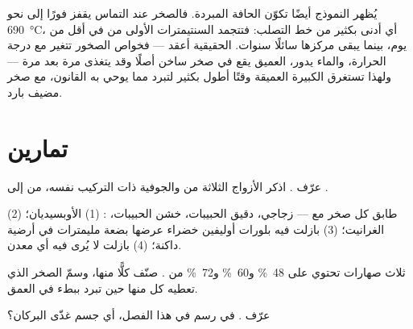 يُظهر النموذج أيضًا تكوّن الحافة المبردة. فالصخر عند التماس
يقفز فورًا إلى نحو \qty{690}{\degreeCelsius}، أي أدنى بكثير من خط التصلب:
فتتجمد السنتيمترات الأولى من  في أقل من يوم، بينما يبقى مركزها
سائلًا سنوات.  الحقيقية أعقد --- فخواص
الصخور تتغير مع درجة الحرارة، والماء يدور،  العميق يقع في صخر
ساخن أصلًا وقد يتغذى مرة بعد مرة --- ولهذا تستغرق  الكبيرة
العميقة وقتًا أطول بكثير لتبرد مما يوحي به القانون، مع صخر مضيف بارد.

\section{تمارين}

\begin{exercise}[$\star$]\label{exo:g11:igneous-rocks:1}
عرّف  . اذكر الأزواج الثلاثة من
 والجوفية ذات التركيب نفسه، من  إلى .
\end{exercise}

\begin{exercise}[$\star$]\label{exo:g11:igneous-rocks:2}
طابق كل صخر مع  --- زجاجي، دقيق الحبيبات، خشن الحبيبات،
: (1) الأوبسيديان؛ (2) الغرانيت؛ (3) بازلت فيه بلورات أوليفين خضراء
عرضها بضعة مليمترات في أرضية داكنة؛ (4) بازلت لا يُرى
فيه أي معدن.
\end{exercise}

\begin{exercise}[$\star$]\label{exo:g11:igneous-rocks:3}
ثلاث صهارات تحتوي على \qty{48}{\percent} و\qty{60}{\percent}
و\qty{72}{\percent} من . صنّف كلًّا منها، وسمّ الصخر الذي تعطيه كل منها
حين تبرد ببطء في العمق.
\end{exercise}

\begin{exercise}[$\star$]\label{exo:g11:igneous-rocks:4}
عرّف   . في رسم  في هذا
الفصل، أي جسم غذّى البركان؟
\end{exercise}

